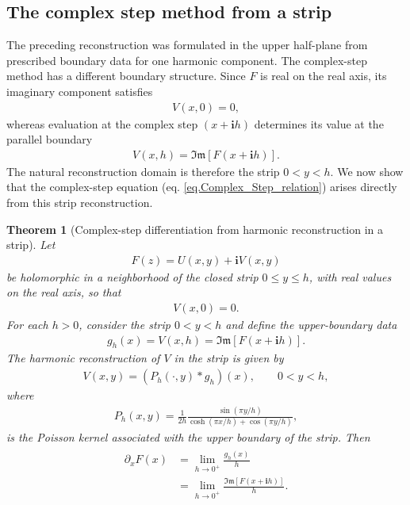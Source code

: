 \documentclass[11pt]{article}
\newtheorem{theorem}{Theorem}[section]
\newcommand{\imag}{\textbf{i}}
\newcommand{\ImagPart}{\mathfrak{Im}}
\begin{document}
	
  
\subsection{The complex step method from a strip}

The preceding reconstruction was formulated in the upper half-plane from prescribed boundary data for one harmonic component. The
complex-step method has a different boundary structure. Since \(F\) is real on the real axis, its imaginary component satisfies
%
\begin{align*}
	V(x,0)=0,
\end{align*}
%
whereas evaluation at the complex step \((x+\imag h)\) determines its value at the parallel boundary
%
\begin{align*}
	V(x,h)
	=
	\ImagPart\!\left[F(x+\imag h)\right].
\end{align*}
%
The natural reconstruction domain is therefore the strip \(0<y<h\). We now show that the complex-step equation (eq. \eqref{eq.Complex_Step_relation}) arises directly from this strip reconstruction.

\begin{theorem}[Complex-step differentiation from harmonic reconstruction in a strip]
	Let
	\begin{align*}
		F(z)=U(x,y)+\imag V(x,y)
	\end{align*}
	be holomorphic in a neighborhood of the closed strip \(0\leq y\leq h\), with real values on the real axis, so that
	\begin{align*}
		V(x,0)=0.
	\end{align*}
	For each \(h>0\), consider the strip \(0<y<h\) and define the
	upper-boundary data
	\begin{align}
		g_h(x)
		=
		V(x,h)
		=
		\ImagPart\!\left[F(x+\imag h)\right].
		\label{eq.CS_strip_data}
	\end{align}
	The harmonic reconstruction of \(V\) in the strip is given by
	\begin{align}
		V(x,y)
		=
		\left(P_h(\cdot,y)*g_h\right)(x),
		\qquad 0<y<h,
		\label{eq.CS_strip_convolution}
	\end{align}
	where
	\begin{align}
		P_h(x,y)
		=
		\frac{1}{2h}
		\frac{\sin(\pi y/h)}
		{\cosh(\pi x/h)+\cos(\pi y/h)} ,
		\label{eq.CS_strip_Poisson}
	\end{align}
	is the Poisson kernel associated with the upper boundary of the strip. Then
	\begin{align}
\begin{aligned}
			\partial_xF(x)
	&=
	\lim_{h\to0^+}
	\frac{g_h(x)}{h}
	\\
	&=
	\lim_{h\to0^+}
	\frac{\ImagPart\!\left[F(x+\imag h)\right]}{h}.
	\label{eq.CS_strip_limit}
\end{aligned}
	\end{align}
\end{theorem}
\end{document}
